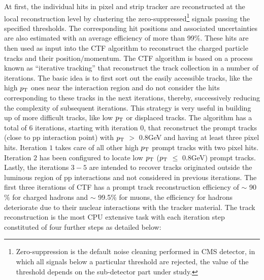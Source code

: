 At first, the individual hits in pixel and strip tracker are reconstructed at the local reconstruction level by clustering the
zero-suppressed\footnote{Zero-suppression is the default noise cleaning performed in CMS detector, in which all signals below a particular threshold
are rejected, the value of the threshold depends on the sub-detector part under study.} signals passing
the specified thresholds. The corresponding hit positions and associated uncertainties are also estimated with an average efficiency of more than 99$\%$.  
These hits are then used as input into the CTF algorithm to reconstruct the charged particle tracks and their position$/$momentum. The CTF algorithm is based on
a process known as ``iterative tracking'' that reconstruct the track collection in a number of iterations. The basic idea is to first sort out the easily accessible
tracks, like the high $p_{\mathrm T}$ ones near the interaction region and do not consider the hits corresponding to these tracks in the next iterations, thereby,
successively reducing the complexity of subsequent iterations. This strategy is very useful in building up of more difficult tracks,
like low $p_{\mathrm T}$ or displaced tracks. The algorithm has a total of $6$ iterations, starting with iteration $0$, that reconstruct the prompt tracks
(close to pp interaction point) with $p_{\mathrm T}$ $>$ 0.8\unit{GeV} and having at least three pixel hits.
Iteration $1$ takes care of all other high $p_{\mathrm T}$ prompt tracks with two pixel hits. Iteration $2$ has been configured to locate low $p_{\mathrm T}$ ($p_{\mathrm T}$ $\le$ 0.8\unit{GeV}) prompt
tracks. Lastly, the iterations $3-5$ are intended to recover tracks originated outside the luminous region of pp interactions and not considered in previous iterations.
The first three iterations of CTF has a prompt track reconstruction efficiency of $\sim$ 90$\%$ for charged hadrons and $\sim$ 99.5$\%$ for muons, the
efficiency for hadrons deteriorate due to their nuclear interactions with the tracker material. The track reconstruction is the most CPU extensive
task with each iteration step constituted of four further steps as detailed below:
